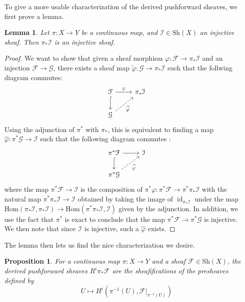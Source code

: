 \documentclass[psamsfonts, 12pt]{amsart}
\newtheorem{prop}[thm]{Proposition}
\newtheorem{lem}[thm]{Lemma}
\theoremstyle{definition}
\theoremstyle{remark}
\renewcommand{\hom}{\mathrm{Hom}}
\newcommand{\inv}{^{-1}}
\DeclareMathOperator{\id}{id}
\begin{document}
To give a more usable characterization of the derived pushforward sheaves,
we first prove a lemma.
%
\begin{lem}
Let $\pi : X \to Y$ be a continuous map, and $\mathcal{I} \in \mathrm{Sh}(X)$
an injective sheaf. Then $\pi_*\mathcal{I}$ is an injective sheaf.
\end{lem}
%
\begin{proof}
We want to show that given a sheaf morphism
$\varphi : \mathcal{F} \to \pi_*\mathcal{I}$ and an injection
$\mathcal{F} \to \mathcal{G}$, there exists a sheaf map
$\widetilde{\varphi} : \mathcal{G} \to \pi_*\mathcal{I}$ such that the follwing
diagram commutes:
\[\begin{tikzcd}
\mathcal{F} \ar[r, "\varphi"] \ar[d, hookrightarrow] & \pi_*\mathcal{I}  \\
\mathcal{G} \ar[ur, "\widetilde{\varphi}"',dashed]
\end{tikzcd}\]
Using the adjunction of $\pi^*$ with $\pi_*$, this is equivalent to finding
a map $\widehat{\varphi} : \pi^*\mathcal{G} \to \mathcal{I}$ such that
the following diagram commutes :
\[\begin{tikzcd}
\pi^*\mathcal{F} \ar[d, hookrightarrow]\ar[r] & \mathcal{I} \\
\pi^*\mathcal{G} \ar[ur, "\widehat{\varphi}"',dashed]
\end{tikzcd}\]
where the map $\pi^*\mathcal{F} \to \mathcal{I}$ is the composition of
$\pi^*\varphi : \pi^*\mathcal{F} \to \pi^*\pi_*\mathcal{I}$ with the
natural map $\pi^*\pi_*\mathcal{I} \to \mathcal{I}$ obtained by taking the image of
$\id_{\pi_*\mathcal{I}}$ under the map
$\hom(\pi_*\mathcal{I},\pi_*\mathcal{I}) \to \hom(\pi^*\pi_*\mathcal{I},\mathcal{I})$
given by the adjunction. In addition, we use the fact that $\pi^*$ is exact to
conclude that the map $\pi^*\mathcal{F} \to \pi^*\mathcal{G}$ is injective. We
then note that since $\mathcal{I}$ is injective, such a $\widehat{\varphi}$ exists.
\end{proof}
%
The lemma then lets us find the nice characterization we desire.
%
\begin{prop}
For a continuous map $\pi : X \to Y$ and a sheaf $\mathcal{F} \in \mathrm{Sh}(X)$,
the derived pushforward sheaves $R^i\pi_*\mathcal{F}$ are the sheafifications
of the presheaves defined by
\[
U \mapsto H^i(\pi\inv(U), \mathcal{F}\vert_{\pi\inv(U)})
\]
\end{prop}
%
\end{document}
